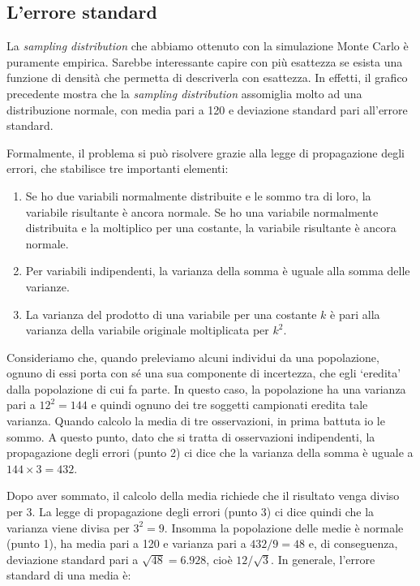 \documentclass[a4paper,12pt,oneside]{book}
\providecommand{\tightlist}{%
  \setlength{\itemsep}{0pt}\setlength{\parskip}{0pt}}
\begin{document}
\hypertarget{lerrore-standard}{%
\subsection{L'errore standard}\label{lerrore-standard}}

La \emph{sampling distribution} che abbiamo ottenuto con la simulazione Monte Carlo è puramente empirica. Sarebbe interessante capire con più esattezza se esista una funzione di densità che permetta di descriverla con esattezza. In effetti, il grafico precedente mostra che la \emph{sampling distribution} assomiglia molto ad una distribuzione normale, con media pari a 120 e deviazione standard pari all'errore standard.

Formalmente, il problema si può risolvere grazie alla legge di propagazione degli errori, che stabilisce tre importanti elementi:

\begin{enumerate}
\def\labelenumi{\arabic{enumi}.}
\tightlist
\item
  Se ho due variabili normalmente distribuite e le sommo tra di loro, la variabile risultante è ancora normale. Se ho una variabile normalmente distribuita e la moltiplico per una costante, la variabile risultante è ancora normale.
\item
  Per variabili indipendenti, la varianza della somma è uguale alla somma delle varianze.
\item
  La varianza del prodotto di una variabile per una costante \(k\) è pari alla varianza della variabile originale moltiplicata per \(k^2\).
\end{enumerate}

Consideriamo che, quando preleviamo alcuni individui da una popolazione, ognuno di essi porta con sé una sua componente di incertezza, che egli `eredita' dalla popolazione di cui fa parte. In questo caso, la popolazione ha una varianza pari a \(12^2 = 144\) e quindi ognuno dei tre soggetti campionati eredita tale varianza. Quando calcolo la media di tre osservazioni, in prima battuta io le sommo. A questo punto, dato che si tratta di osservazioni indipendenti, la propagazione degli errori (punto 2) ci dice che la varianza della somma è uguale a \(144 \times 3 = 432\).

Dopo aver sommato, il calcolo della media richiede che il risultato venga diviso per 3. La legge di propagazione degli errori (punto 3) ci dice quindi che la varianza viene divisa per \(3^2 = 9\). Insomma la popolazione delle medie è normale (punto 1), ha media pari a 120 e varianza pari a \(432/9 = 48\) e, di conseguenza, deviazione standard pari a \(\sqrt{48} = 6.928\), cioè \(12/\sqrt{3}\). In generale, l'errore standard di una media è:
\end{document}
